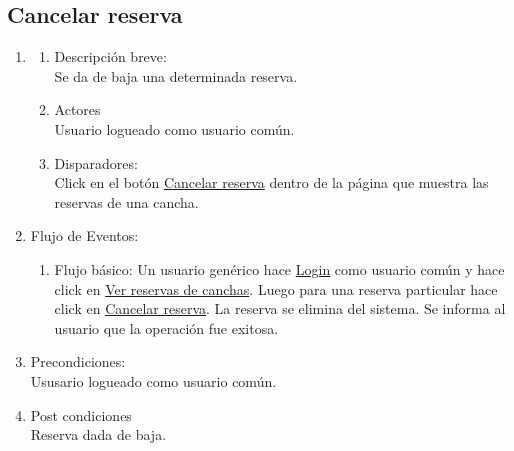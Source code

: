 \documentclass[a4paper,11pt]{article}
\begin{document}
\subsection{Cancelar reserva}
\begin{enumerate}

    \item
    \begin{enumerate}
    \item Descripción breve: \\
        Se da de baja una determinada reserva.
    \item Actores \\
        Usuario logueado como usuario común.
    \item Disparadores: \\
        Click en el botón \underline{Cancelar reserva} dentro de la
        página que muestra las reservas de una cancha.
    \end{enumerate}

    \item Flujo de Eventos:

    \begin{enumerate}

        \item Flujo básico:
            Un usuario genérico hace \underline{Login} como usuario común y
            hace click en \underline{Ver reservas de canchas}. Luego para una
            reserva particular hace click en \underline{Cancelar reserva}.
            La reserva se elimina del sistema. Se informa al usuario que la
            operación fue exitosa.

    \end{enumerate}

    \item Precondiciones: \\
        Ususario logueado como usuario común.

    \item Post condiciones \\
        Reserva dada de baja.

\end{enumerate}
\end{document}

